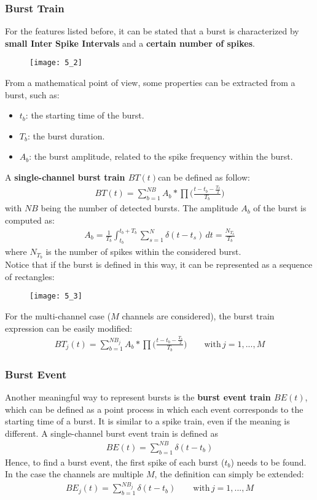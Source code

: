 \subsubsection{Burst Train}
For the features listed before, it can be stated that a burst is characterized by \textbf{small Inter Spike Intervals} and a \textbf{certain number of spikes}.
\begin{figure}[H]
    \texttt{[image: 5\_2]}
    \centering
\end{figure}
From a mathematical point of view, some properties can be extracted from a burst, such as:
\begin{itemize}
    \item \(t_b\): the starting time of the burst.
    \item \(T_b\): the burst duration.
    \item \(A_b\): the burst amplitude, related to the spike frequency within the burst.
\end{itemize}
A \textbf{single-channel burst train \(BT(t)\)}can be defined as follow:
\begin{align*}
    BT(t) = \sum_{b=1}^{NB}A_b*\prod\biggl(\frac{t-t_b-\frac{T_b}{2}}{T_b}\biggr)
\end{align*}
with \(NB\) being the number of detected bursts.
The amplitude \(A_b\) of the burst is computed as:
\begin{align*}
    A_b=\frac{1}{T_b}\int_{t_b}^{t_b+T_b}\sum_{s=1}^{N}\delta{(t-t_s)}\,dt=\frac{N_{T_b}}{T_b}
\end{align*}
where \(N_{T_b}\) is the number of spikes within the considered burst.\\
Notice that if the burst is defined in this way, it can be represented as a sequence of rectangles:
\begin{figure}[H]
    \texttt{[image: 5\_3]}
    \centering
\end{figure}
For the multi-channel case (\(M\) channels are considered), the burst train
expression can be easily modified:
\begin{align*}
    BT_{j}(t) = \sum_{b=1}^{NB_{j}}A_b*\prod\biggl(\frac{t-t_b-\frac{T_b}{2}}{T_b}\biggr)
    \quad\quad\text{with}\,j=1,...,M
\end{align*}
\subsubsection{Burst Event}
Another meaningful way to represent bursts is the \textbf{burst event train \(BE(t)\)}, which can be defined as a point process in which each event corresponds to the starting time of a burst. It is similar to a spike train, even if the meaning is different. 
A single-channel burst event train is defined as
\begin{align*}
    BE(t)=\sum_{b=1}^{NB}\delta(t-t_b)
\end{align*}
Hence, to find a burst event, the first spike of each burst (\(t_b\)) needs to be found.\\
In the case the channels are multiple \(M\), the definition can simply be extended:
\begin{align*}
    BE_{j}(t)=\sum_{b=1}^{NB_{j}}\delta(t-t_b)
    \quad\quad\text{with}\,j=1,...,M
\end{align*}


